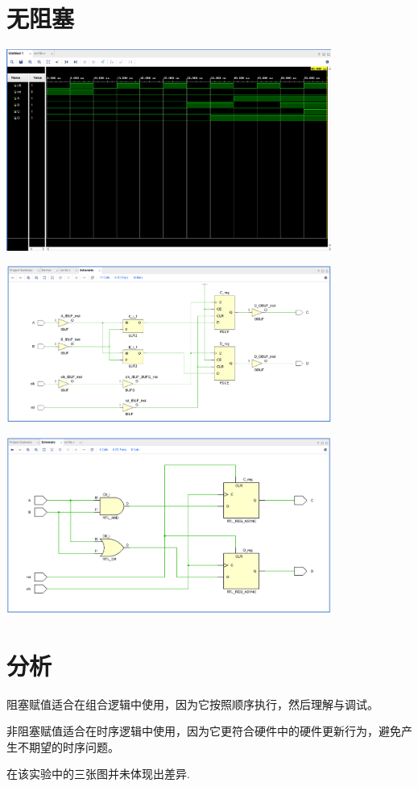 \documentclass{article} %
\begin{document}
\section{无阻塞}
\includegraphics[width=0.8\textwidth]{21.png}\par
\includegraphics[width=0.8\textwidth]{22.png}\par
\includegraphics[width=0.8\textwidth]{23.png}\par
\section{分析}
阻塞赋值适合在组合逻辑中使用，因为它按照顺序执行，然后理解与调试。\par
非阻塞赋值适合在时序逻辑中使用，因为它更符合硬件中的硬件更新行为，避免产生不期望的时序问题。\par
在该实验中的三张图并未体现出差异.

$$
$$
\end{document}
